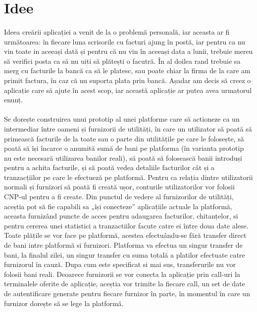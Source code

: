 \documentclass[12pt]{report}
\begin{document}
	\section{Idee}
	\paragraph{}Ideea creării aplicației a venit de la o problemă personală, iar aceasta ar fi următoarea: în fiecare luna scrisorile cu facturi ajung în postă, iar pentru ca nu vin toate in aceeași dată și pentru că nu vin în aceeași data a lunii, trebuie mereu să verifici posta ca să nu uiti să plătești o facutră. În al doilea rand trebuie sa merg cu facturile la bancă ca să le platesc, sau poate chiar la firma de la care am primit factura, în caz că nu suporta plata prin bancă. Așadar am decis să creez o aplicație care să ajute în acest scop, iar această aplicație ar putea avea urmatorul enunț.
	\paragraph{}Se dorește construirea unui prototip al unei platforme care să actioneze ca un intermediar între oameni și furnizorii de utilități, în care un utilizator să poată să primească facturile de la toate sau o parte din utilitățile pe care le folosește, să poată să își încarce o anumită sumă de bani pe platforma (în varianta prototip nu este necesară utilizarea banilor reali), să poată să folosească banii introduși pentru a achita facturile, și să poată vedea detaliile facturilor cât și a tranzacțiilor pe care le efectueză pe platformă. Pentru ca relația dintre utilizatorii normali și furnizori să poată fi creată ușor, conturile utilizatorilor vor folosii CNP-ul pentru a fi create. Din punctul de vedere al furnizorilor de utilități, aceștia pot să fie capabili sa „își conecteze” aplicațiile actuale la platformă, aceasta furnizând puncte de acces pentru adaugarea facturilor, chitanțelor, si pentru cererea unei statistici a tranzactiilor facute catre ei între doua date alese. Toate plățile se vor face pe platformă, acestea efectuându-se fără transfer direct de bani intre platformă si furnizori. Platforma va efectua un singur transfer de bani, la finalul zilei, un singur transfer cu suma totală a platilor efectuate catre furnizorul în cauză. Dupa cum este specificat si mai sus, transferurile nu vor folosii bani reali. Deoarece furnizorii se vor conecta la aplicație prin call-uri la terminalele oferite de aplicație, aceștia vor trimite la fiecare call, un set de date de autentificare generate pentru fiecare furnizor în parte, în momentul în care un furnizor dorește să se lege la platformă. 
\end{document}

